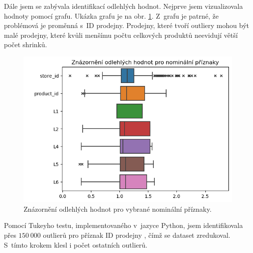 
Dále jsem se zabývala identifikací odlehlých hodnot. Nejprve jsem vizualizovala hodnoty pomocí grafu. Ukázka grafu je na obr. \ref*{obr:rok:g:outlierN}. Z~grafu je patrné, že problémová je proměnná s~ID prodejny. Prodejny, které tvoří outliery mohou být malé prodejny, které kvůli menšímu počtu celkových produktů neevidují větší počet shrinků. %

\begin{figure}[hbtp!]
        \centering
        \captionsetup{justification=centering}
        
        \includegraphics[width=.6\textwidth]{obrazky/zntb/box_nominal.png}
        \caption{Znázornění odlehlých hodnot pro vybrané nominální příznaky.}
        \label{obr:rok:g:outlierN}

\end{figure}

Pomocí Tukeyho testu, implementovaného v~jazyce Python, jsem identifikovala přes $150\ 000$ outlierů pro příznak ID prodejny %
, čímž se dataset zredukoval. S~tímto krokem klesl i počet ostatních outlierů.

